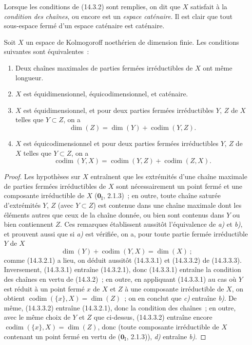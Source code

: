Lorsque les conditions de (14.3.2) sont remplies, on dit que $X$ satisfait à
la \emph{condition des chaînes}, ou encore est un \emph{espace caténaire}. Il
est clair que tout sous-espace fermé d'un espace caténaire est caténaire.

\begin{proposition}[14.3.3]
\label{0.14.3.3-fr}
Soit $X$ un espace de Kolmogoroff noethérien de dimension finie. Les
conditions suivantes sont équivalentes~:
\begin{enumerate}
  \item[\textup{a)}] Deux chaînes maximales de parties fermées irréductibles de $X$
  ont même longueur.
  \item[\textup{b)}] $X$ est équidimensionnel, équicodimensionnel, et caténaire.
  \item[\textup{c)}] $X$ est équidimensionnel, et pour deux parties fermées
  irréductibles $Y$, $Z$ de $X$ telles que $Y\subset Z$, on a
  \[
    \dim(Z)=\dim(Y)+\operatorname{codim}(Y,Z).
    \tag{14.3.3.1}\label{0.14.3.3.1-fr}
  \]
  \item[\textup{d)}] $X$ est équicodimensionnel et pour deux parties fermées
  irréductibles $Y$, $Z$ de $X$ telles que $Y\subset Z$, on a
  \[
    \operatorname{codim}(Y,X)=
    \operatorname{codim}(Y,Z)+\operatorname{codim}(Z,X).
    \tag{14.3.3.2}\label{0.14.3.3.2-fr}
  \]
\end{enumerate}
\end{proposition}

\begin{proof}
Les hypothèses sur $X$ entraînent que les extrémités d'une chaîne maximale de
parties fermées irréductibles de $X$ sont nécessairement un point fermé et
une composante irréductible de $X$ ($\mathbf{0}_{\mathrm I}$, 2.1.3)~; en outre, toute
chaîne saturée d'extrémités $Y$, $Z$ (avec $Y\subset Z$) est contenue dans une
chaîne maximale dont les éléments autres que ceux de la chaîne donnée, ou
bien sont contenus dans $Y$ ou bien contiennent $Z$. Ces remarques
établissent aussitôt l'équivalence de \emph{a)} et \emph{b)}, et prouvent aussi que si \emph{a)}
est vérifiée, on a, pour toute partie fermée irréductible $Y$ de $X$
\[
  \dim(Y)+\operatorname{codim}(Y,X)=\dim(X)~;
  \tag{14.3.3.3}\label{0.14.3.3.3-fr}
\]
comme (14.3.2.1) a lieu, on déduit aussitôt (14.3.3.1) et (14.3.3.2) de
(14.3.3.3). Inversement, (14.3.3.1) entraîne (14.3.2.1), donc (14.3.3.1)
entraîne la condition des chaînes en vertu de (14.3.2)~; en outre, en
appliquant (14.3.3.1) au cas où $Y$ est réduit à un point fermé $x$ de $X$ et
$Z$ à une composante irréductible de $X$, on obtient
$\operatorname{codim}(\{x\},X)=\dim(Z)$~; on en conclut que \emph{c)} entraîne \emph{b)}.
De même, (14.3.3.2) entraîne (14.3.2.1), donc la condition des chaînes~; en
outre, avec le même choix de $Y$ et $Z$ que ci-dessus, (14.3.3.2) entraîne
encore $\operatorname{codim}(\{x\},X)=\dim(Z)$, donc (toute composante
irréductible de $X$ contenant un point fermé en vertu de ($\mathbf{0}_{\mathrm I}$,
2.1.3)), \emph{d)} entraîne \emph{b)}.
\end{proof}

